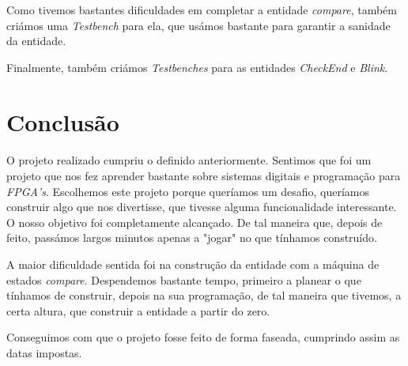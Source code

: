 \documentclass[11pt,openany,twoside]{report}
\begin{document}
Como tivemos bastantes dificuldades em completar a entidade \textit{compare}, também criámos uma \textit{Testbench} para ela, que usámos bastante para garantir a sanidade da entidade.

Finalmente, também criámos \textit{Testbenches} para as entidades \textit{CheckEnd} e \textit{Blink}.

\section{Conclusão}

\paragraph{ } O projeto realizado cumpriu o definido anteriormente. Sentimos que foi um projeto que nos fez aprender bastante sobre sistemas digitais e programação para \textit{FPGA's}. Escolhemos este projeto porque queríamos um desafio, queríamos construir algo que nos divertisse, que tivesse alguma funcionalidade interessante. O nosso objetivo foi completamente alcançado. De tal maneira que, depois de feito, passámos largos minutos apenas a "jogar" no que tínhamos construído.

A maior dificuldade sentida foi na construção da entidade com a máquina de estados \textit{compare}. Despendemos bastante tempo, primeiro a planear o que tínhamos de construir, depois na sua programação, de tal maneira que tivemos, a certa altura, que construir a entidade a partir do zero.

Conseguimos com que o projeto fosse feito de forma faseada, cumprindo assim as datas impostas.
\end{document}
